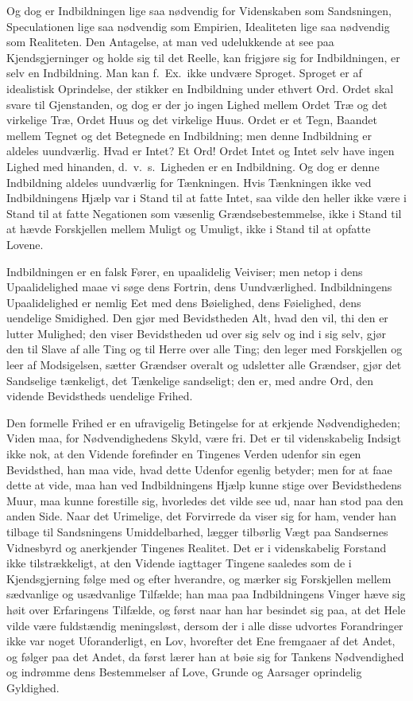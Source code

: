 \documentclass[12pt]{book}
\newcommand{\apage}[1]{\marginnote{\footnotesize\textit{[#1]}}}
\begin{document}
Og dog er Indbildningen lige saa nødvendig for Videnskaben som
Sandsningen, Speculationen lige saa nødvendig som Empirien, Idealiteten
lige saa nødvendig som Realiteten. Den Antagelse, at man ved udelukkende
at see paa Kjendsgjerninger og holde sig til det Reelle, kan frigjøre sig
for Indbildningen, er selv en Indbildning. Man kan f.\ Ex.\ ikke undvære
Sproget. Sproget er af idealistisk Oprindelse, der stikker en Indbildning
under ethvert Ord. Ordet skal svare til Gjenstanden, og dog er der jo
ingen Lighed mellem \apage{28} Ordet Træ og det virkelige Træ, Ordet Huus og det
virkelige Huus. Ordet er et Tegn, Baandet mellem Tegnet og det Betegnede
en Indbildning; men denne Indbildning er aldeles uundværlig. Hvad er
Intet? Et Ord! Ordet Intet og Intet selv have ingen Lighed med hinanden,
d.\ v.\ s.\ Ligheden er en Indbildning. Og dog er denne Indbildning aldeles
uundværlig for Tænkningen. Hvis Tænkningen ikke ved Indbildningens Hjælp
var i Stand til at fatte Intet, saa vilde den heller ikke være i Stand til
at fatte Negationen som væsenlig Grændsebestemmelse, ikke i Stand til at
hævde Forskjellen mellem Muligt og Umuligt, ikke i Stand til at opfatte
Lovene.

Indbildningen er en falsk Fører, en upaalidelig Veiviser; men netop i dens
Upaalidelighed maae vi søge dens Fortrin, dens Uundværlighed.
Indbildningens Upaalidelighed er nemlig Eet med dens Bøielighed, dens
Føielighed, dens uendelige Smidighed. Den gjør med Bevidstheden Alt, hvad
den vil, thi den er lutter Mulighed; den viser Bevidstheden ud over sig
selv og ind i sig selv, gjør den til Slave af alle Ting og til Herre over
alle Ting; den leger med Forskjellen og leer af Modsigelsen, sætter
Grændser overalt og udsletter alle Grændser, gjør det Sandselige
tænkeligt, det Tænkelige sandseligt; den er, med andre Ord, den vidende
Bevidstheds uendelige Frihed.

Den formelle Frihed er en ufravigelig Betingelse for at erkjende
Nødvendigheden; Viden maa, for Nødvendighedens Skyld, være fri. Det er til
videnskabelig Indsigt ikke nok, at den Vidende forefinder en  \apage{29} Tingenes
Verden udenfor sin egen Bevidsthed, han maa vide, hvad dette Udenfor
egenlig betyder; men for at faae dette at vide, maa han ved Indbildningens
Hjælp kunne stige over Bevidsthedens Muur, maa kunne forestille sig,
hvorledes det vilde see ud, naar han stod paa den anden Side. Naar det
Urimelige, det Forvirrede da viser sig for ham, vender han tilbage til
Sandsningens Umiddelbarhed, lægger tilbørlig Vægt paa Sandsernes
Vidnesbyrd og anerkjender Tingenes Realitet. Det er i videnskabelig
Forstand ikke tilstrækkeligt, at den Vidende iagttager Tingene saaledes
som de i Kjendsgjerning følge med og efter hverandre, og mærker sig
Forskjellen mellem sædvanlige og usædvanlige Tilfælde; han maa paa
Indbildningens Vinger hæve sig høit over Erfaringens Tilfælde, og først
naar han har besindet sig paa, at det Hele vilde være fuldstændig
meningsløst, dersom der i alle disse udvortes Forandringer ikke var noget
Uforanderligt, en Lov, hvorefter det Ene fremgaaer af det Andet, og følger
paa det Andet, da først lærer han at bøie sig for Tankens Nødvendighed og
indrømme dens Bestemmelser af Love, Grunde og Aarsager oprindelig
Gyldighed.
\end{document}
